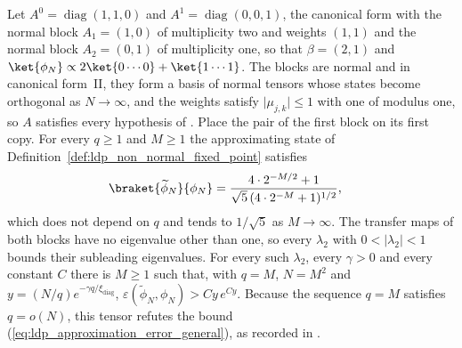\begin{lemma}
    \label{thm:ldp_approximation_error_repeated_block}
    \leanok
    Let $A^0=\operatorname{diag}(1,1,0)$ and $A^1=\operatorname{diag}(0,0,1)$,
    the canonical form with the normal block $A_1=(1,0)$ of multiplicity two and
    weights $(1,1)$ and the normal block $A_2=(0,1)$ of multiplicity one, so that
    $\beta=(2,1)$ and $\ket{\phi_N}\propto2\ket{0\cdots0}+\ket{1\cdots1}$.
    The blocks are normal and in canonical form~II, they form a basis of normal
    tensors whose states become orthogonal as $N\to\infty$, and the weights satisfy $\lvert\mu_{j,k}\rvert\leq1$ with one of
    modulus one, so $A$ satisfies every hypothesis of
    \cite[Lemma~1$'$(ii)]{Malz2024Preparation}. Place
    the pair of the first block on its first copy. For every $q\geq1$ and
    $M\geq1$ the approximating state of
    Definition~\ref{def:ldp_non_normal_fixed_point} satisfies
    \begin{align}
        \braket{\widetilde\phi_N}{\phi_N}
         & =\frac{4\cdot2^{-M/2}+1}{\sqrt5\,(4\cdot2^{-M}+1)^{1/2}},
        \label{eq:ldp_repeated_block_overlap}
    \end{align}
    which does not depend on $q$ and tends to $1/\sqrt5$ as $M\to\infty$. The
    transfer maps of both blocks have no eigenvalue other than one, so every
    $\lambda_2$ with $0<\lvert\lambda_2\rvert<1$ bounds their subleading
    eigenvalues. For every such $\lambda_2$, every $\gamma>0$ and every constant
    $C$ there is $M\geq1$ such that, with $q=M$, $N=M^2$ and
    $y=(N/q)e^{-\gamma q/\xi_{\mathrm{diag}}}$,
    $\varepsilon(\widetilde\phi_N,\phi_N)>Cy\,e^{Cy}$. Because the sequence $q=M$
    satisfies $q=o(N)$, this tensor refutes the bound (\ref{eq:ldp_approximation_error_general}),
    as recorded in \cite{gap:mswc24_multiplicity_fixed_point}.
\end{lemma}


